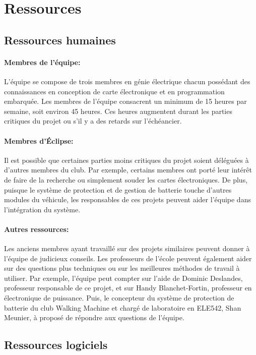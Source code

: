 \section{Ressources}

	\subsection{Ressources humaines}
	
		\paragraph{Membres de l'équipe:}
		L'équipe se compose de trois membres en génie électrique chacun possédant des connaissances en conception de carte électronique et en programmation embarquée. Les membres de l'équipe consacrent un minimum de 15 heures par semaine, soit environ 45 heures. Ces heures augmentent durant les parties critiques du projet ou s'il y a des retards sur l'échéancier.
		
		\paragraph{Membres d'Éclipse:}
		Il est possible que certaines parties moins critiques du projet soient déléguées à d'autres membres du club. Par exemple, certains membres ont porté leur intérêt de faire de la recherche ou simplement souder les cartes électroniques. De plus, puisque le système de protection et de gestion de batterie touche d'autres modules du véhicule, les responsables de ces projets peuvent aider l'équipe dans l'intégration du système.
		
		\paragraph{Autres ressources:}
		Les anciens membres ayant travaillé sur des projets similaires peuvent donner à l'équipe de judicieux conseils. Les professeurs de l'école peuvent également aider sur des questions plus techniques ou sur les meilleures méthodes de travail à utiliser. Par exemple, l'équipe peut compter sur l'aide de Dominic Deslandes, professeur responsable de ce projet, et sur Handy Blanchet-Fortin, professeur en électronique de puissance. Puis, le concepteur du système de protection de batterie du club Walking Machine et chargé de laboratoire en ELE542, Shan Meunier, à proposé de répondre aux questions de l'équipe.
		
	\subsection{Ressources logiciels}
